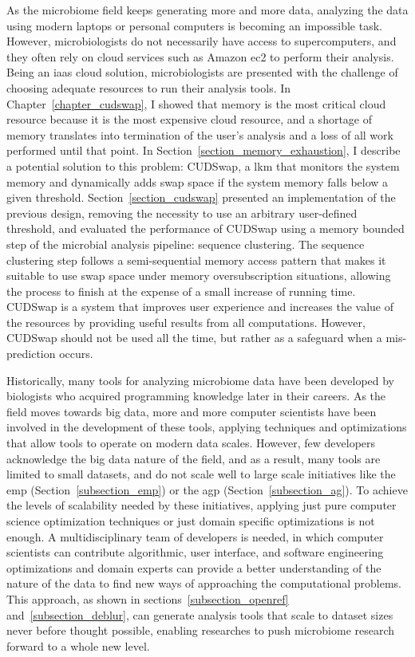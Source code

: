 As the microbiome field keeps generating more and more data, analyzing the data
using modern laptops or personal computers is becoming an impossible task. However,
microbiologists do not necessarily have access to supercomputers, and they often
rely on cloud services such as Amazon \gls{ec2} to perform their analysis. Being an \gls{iaas}
cloud solution, microbiologists are presented with the challenge of choosing adequate
resources to run their analysis tools. In Chapter~\ref{chapter_cudswap}, I showed
that memory is the most critical cloud resource because it is the most expensive
cloud resource, and a shortage of memory translates into termination of the user's
analysis and a loss of all work performed until that point. In Section~\ref{section_memory_exhaustion},
I describe a potential solution to this problem: CUDSwap, a \gls{lkm} that monitors
the system memory and dynamically adds swap space if the system memory falls below
a given threshold. Section~\ref{section_cudswap} presented an implementation of
the previous design, removing the necessity to use an arbitrary user-defined threshold, and
evaluated the performance of CUDSwap using a memory bounded step of the
microbial analysis pipeline: sequence clustering. The sequence clustering step
follows a semi-sequential memory access pattern that makes it suitable to use
swap space under memory oversubscription situations, allowing the process to
finish at the expense of a small increase of running time. CUDSwap is a system
that improves user experience and increases the value of the resources by providing
useful results from all computations. However, CUDSwap should not be used all the time,
but rather as a safeguard when a mis-prediction occurs.

Historically, many tools for analyzing microbiome data have been developed by biologists
who acquired programming knowledge later in their careers. As the field moves towards big data,
more and more computer scientists have been involved in the development of these
tools, applying techniques and optimizations that allow tools to operate on modern
data scales. However, few developers acknowledge the big data nature of the field, and
as a result, many tools are limited to small
datasets, and do not scale well to large scale initiatives like the \gls{emp}
(Section~\ref{subsection_emp}) or the \gls{agp} (Section~\ref{subsection_ag}). To
achieve the levels of scalability needed by these initiatives, applying just pure
computer science optimization techniques or just domain specific optimizations is
not enough. A multidisciplinary team of developers is needed, in which computer
scientists can contribute algorithmic, user interface, and software engineering optimizations and domain experts can provide
a better understanding of the nature of the data to find new ways of approaching
the computational problems. This approach, as shown in sections~\ref{subsection_openref}
and~\ref{subsection_deblur}, can generate analysis tools that scale to dataset
sizes never before thought possible, enabling researches to push microbiome
research forward to a whole new level.

